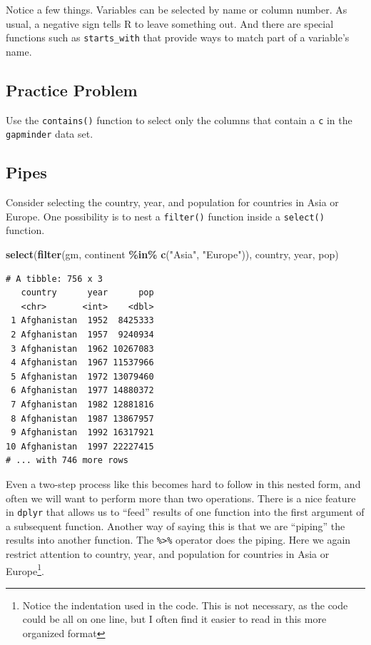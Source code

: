 \documentclass[
]{krantz}
\makeatletter
\newenvironment{Shaded}{\begin{snugshade}}{\end{snugshade}}
\newcommand{\KeywordTok}[1]{\textcolor[rgb]{0.27,0.27,0.27}{\textbf{#1}}}
\newcommand{\NormalTok}[1]{#1}
\newcommand{\OperatorTok}[1]{\textcolor[rgb]{0.43,0.43,0.43}{\textbf{#1}}}
\newcommand{\StringTok}[1]{\textcolor[rgb]{0.5,0.5,0.5}{#1}}
\newenvironment{kframe}{%
\medskip{}
\setlength{\fboxsep}{.8em}
 \def\at@end@of@kframe{}%
 \ifinner\ifhmode%
  \def\at@end@of@kframe{\end{minipage}}%
  \begin{minipage}{\columnwidth}%
 \fi\fi%
 \def\FrameCommand##1{\hskip\@totalleftmargin \hskip-\fboxsep
 \colorbox{shadecolor}{##1}\hskip-\fboxsep
     \hskip-\linewidth \hskip-\@totalleftmargin \hskip\columnwidth}%
 \MakeFramed {\advance\hsize-\width
   \@totalleftmargin\z@ \linewidth\hsize
   \@setminipage}}%
 {\par\unskip\endMakeFramed%
 \at@end@of@kframe}
\renewenvironment{Shaded}{\begin{kframe}}{\end{kframe}}
\makeatother
\begin{document}
Notice a few things. Variables can be selected by name or column number. As usual, a negative sign tells R to leave something out. And there are special functions such as \texttt{starts\_with} that provide ways to match part of a variable's name.

\hypertarget{ch6PP4}{%
\subsection{Practice Problem}\label{ch6PP4}}

Use the \texttt{contains()} function to select only the columns that contain a \texttt{c} in the \texttt{gapminder} data set.

\hypertarget{pipes}{%
\subsection{Pipes}\label{pipes}}

Consider selecting the country, year, and population for countries in Asia or Europe. One possibility is to nest a \texttt{filter()} function inside a \texttt{select()} function.

\begin{Shaded}
\begin{Highlighting}[]
\KeywordTok{select}\NormalTok{(}\KeywordTok{filter}\NormalTok{(gm, continent }\OperatorTok{\%in\%}\StringTok{ }\KeywordTok{c}\NormalTok{(}\StringTok{"Asia"}\NormalTok{, }\StringTok{"Europe"}\NormalTok{)), country, year, pop)}
\end{Highlighting}
\end{Shaded}

\begin{verbatim}
# A tibble: 756 x 3
   country      year      pop
   <chr>       <int>    <dbl>
 1 Afghanistan  1952  8425333
 2 Afghanistan  1957  9240934
 3 Afghanistan  1962 10267083
 4 Afghanistan  1967 11537966
 5 Afghanistan  1972 13079460
 6 Afghanistan  1977 14880372
 7 Afghanistan  1982 12881816
 8 Afghanistan  1987 13867957
 9 Afghanistan  1992 16317921
10 Afghanistan  1997 22227415
# ... with 746 more rows
\end{verbatim}

Even a two-step process like this becomes hard to follow in this nested form, and often we will want to perform more than two operations. There is a nice feature in \texttt{dplyr} that allows us to ``feed'' results of one function into the first argument of a subsequent function. Another way of saying this is that we are ``piping'' the results into another function. The \texttt{\%\textgreater{}\%} operator does the piping. Here we again restrict attention to country, year, and population for countries in Asia or Europe\footnote{Notice the indentation used in the code. This is not necessary, as the code could be all on one line, but I often find it easier to read in this more organized format}.
\end{document}
